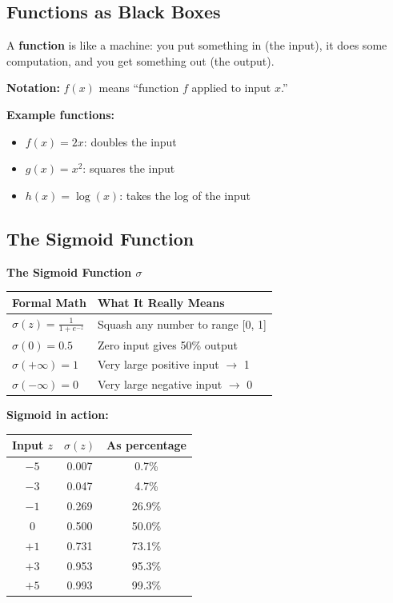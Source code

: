\begin{chapterenv}
\subsection{Functions as Black Boxes}

A \textbf{function} is like a machine: you put something in (the input), it does some computation, and you get something out (the output).

\textbf{Notation:} $f(x)$ means ``function $f$ applied to input $x$.''

\textbf{Example functions:}
\begin{itemize}[nosep]
    \item $f(x) = 2x$: doubles the input
    \item $g(x) = x^2$: squares the input
    \item $h(x) = \log(x)$: takes the log of the input
\end{itemize}

\subsection{The Sigmoid Function}

\begin{infobox}
\textbf{The Sigmoid Function $\sigma$}

\begin{center}
\begin{tabular}{p{}p{}}
\toprule
\textbf{Formal Math} & \textbf{What It Really Means} \\
\midrule
$\sigma(z) = \frac{1}{1 + e^{-z}}$ & Squash any number to range [0, 1] \\
\midrule
$\sigma(0) = 0.5$ & Zero input gives 50\% output \\
$\sigma(+\infty) = 1$ & Very large positive input $\to$ 1 \\
$\sigma(-\infty) = 0$ & Very large negative input $\to$ 0 \\
\bottomrule
\end{tabular}
\end{center}
\end{infobox}

\textbf{Sigmoid in action:}

\begin{center}
\begin{tabular}{ccc}
\toprule
\textbf{Input $z$} & \textbf{$\sigma(z)$} & \textbf{As percentage} \\
\midrule
$-5$ & 0.007 & 0.7\% \\
$-3$ & 0.047 & 4.7\% \\
$-1$ & 0.269 & 26.9\% \\
$0$ & 0.500 & 50.0\% \\
$+1$ & 0.731 & 73.1\% \\
$+3$ & 0.953 & 95.3\% \\
$+5$ & 0.993 & 99.3\% \\
\bottomrule
\end{tabular}
\end{center}


\end{chapterenv}
